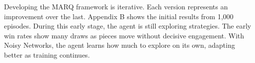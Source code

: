 Developing the MARQ framework is iterative. Each version represents an improvement over the last. Appendix B shows the initial results from 1,000 episodes. During this early stage, the agent is still exploring strategies. The early win rates show many draws as pieces move without decisive engagement. With Noisy Networks, the agent learns how much to explore on its own, adapting better as training continues.

